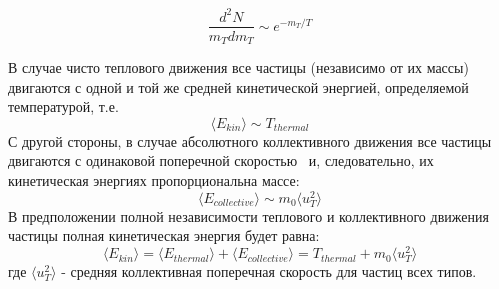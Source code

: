 \begin{equation}
	\frac{d^2N}{m_Tdm_T} \sim e^{-m_T/T}
	\label{eq:InvSlopeRon}
\end{equation}

В случае чисто теплового движения все частицы (независимо от их массы) двигаются с одной и той же средней кинетической энергией, определяемой температурой, т.е.
$$\langle E_{kin} \rangle \sim T_{thermal}$$
С другой стороны, в случае абсолютного коллективного движения все частицы двигаются с одинаковой поперечной скоростью \ut \ и, следовательно, их кинетическая энергиях пропорциональна массе:
$$\langle E_{collective} \rangle \sim m_0 \langle u_T ^2 \rangle $$
В предположении полной независимости теплового и коллективного движения частицы полная кинетическая энергия будет равна:
$$ \langle E_{kin} \rangle = \langle E_{thermal} \rangle + \langle E_{collective} \rangle = T_{thermal}+ m_0 \langle u_T ^2 \rangle $$
где $ \langle u_T ^2 \rangle$ - средняя коллективная поперечная скорость для частиц всех типов. 



